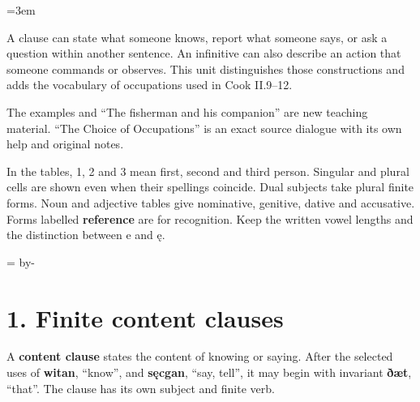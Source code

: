 \BookRecto
\begingroup
\renewcommand{\runningtitle}{Unit 9. Complements and reports}
\emergencystretch=3em
\newcommand{\itempara}[2]{\par\addvspace{3pt}\noindent\hangindent=1.8em\hangafter=1\makebox[1.8em][l]{#1.}#2\par}
\newcommand{\reserve}[1]{\par\penalty-100\begingroup\dimen0=\pagegoal\advance\dimen0 by-\pagetotal\ifdim\dimen0<#1\newpage\fi\endgroup}

\raggedright
{}

A clause can state what someone knows, report what someone says, or ask a question within another sentence. An infinitive can also describe an action that someone commands or observes. This unit distinguishes those constructions and adds the vocabulary of occupations used in Cook II.9–12.

The examples and “The fisherman and his companion” are new teaching material. “The Choice of Occupations” is an exact source dialogue with its own help and original notes.

In the tables, 1, 2 and 3 mean first, second and third person. Singular and plural cells are shown even when their spellings coincide. Dual subjects take plural finite forms. Noun and adjective tables give nominative, genitive, dative and accusative. Forms labelled \textbf{reference} are for recognition. Keep the written vowel lengths and the distinction between e and ę.

\reserve{7\baselineskip}
\section*{1. Finite content clauses}

A \textbf{content clause} states the content of knowing or saying. After the selected uses of \textbf{witan}, “know”, and \textbf{sęcgan}, “say, tell”, it may begin with invariant \textbf{ðæt}, “that”. The clause has its own subject and finite verb.

